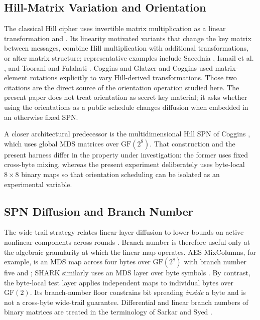 \documentclass[cryptography,article,submit,oneauthor]{Definitions/mdpi}
\begin{document}
\subsection{Hill-Matrix Variation and Orientation}\label{sec:2-1}
The classical Hill cipher uses invertible matrix multiplication as a linear transformation \cite{ref8} and \cite{ref9}. Its linearity motivated variants that change the key matrix between messages, combine Hill multiplication with additional transformations, or alter matrix structure; representative examples include Saeednia \cite{ref26}, Ismail et al. \cite{ref28}, and Toorani and Falahati \cite{ref20}. Coggins and Glatzer \cite{ref10} and Coggins \cite{ref11} used matrix-element rotations explicitly to vary Hill-derived transformations. Those two citations are the direct source of the orientation operation studied here. The present paper does not treat orientation as secret key material; it asks whether using the orientations as a public schedule changes diffusion when embedded in an otherwise fixed SPN.

A closer architectural predecessor is the multidimensional Hill SPN of Coggins \cite{ref22}, which uses global MDS matrices over $\mathrm{GF}(2^8)$. That construction and the present harness differ in the property under investigation: the former uses fixed cross-byte mixing, whereas the present experiment deliberately uses byte-local $8\times8$ binary maps so that orientation scheduling can be isolated as an experimental variable.

\subsection{SPN Diffusion and Branch Number}\label{sec:2-2}
The wide-trail strategy relates linear-layer diffusion to lower bounds on active nonlinear components across rounds \cite{ref21}. Branch number is therefore useful only at the algebraic granularity at which the linear map operates. AES MixColumns, for example, is an MDS map across four bytes over $\mathrm{GF}(2^8)$ with branch number five \cite{ref5} and \cite{ref6}; SHARK similarly uses an MDS layer over byte symbols \cite{ref24}. By contrast, the byte-local test layer applies independent maps to individual bytes over $\mathrm{GF}(2)$. Its branch-number floor constrains bit spreading \emph{inside} a byte and is not a cross-byte wide-trail guarantee. Differential and linear branch numbers of binary matrices are treated in the terminology of Sarkar and Syed \cite{ref18}.
\end{document}
